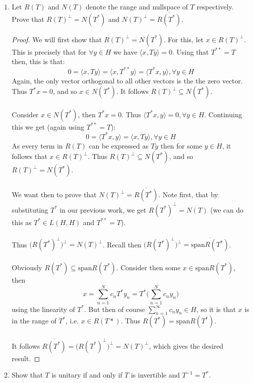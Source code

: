\documentclass[12pt]{article}
\newenvironment{ex}[2][Exercise]{\begin{trivlist}
\item[\hskip \labelsep {\bfseries #1}\hskip \labelsep {\bfseries #2.}]}{\end{trivlist}}
\begin{document}
\begin{ex}{8}
\begin{enumerate}[label=(\alph*)]
        \item Let $R(T)$ and $N(T)$ denote the range and nullspace of $T$ respectively. Prove that $R(T)^\perp = N(T^*)$ and $N(T)^\perp = \overline{R(T^*)}$.
        \begin{proof}
            We will first show that $R(T)^\perp = N(T^*)$. For this, let $x \in R(T)^\perp$. This is precisely that for $\forall y \in H$ we have $\langle x, Ty \rangle = 0$. Using that $T^{**} = T$ then, this is that:
            $$0 = \langle x, Ty \rangle = \langle x, T^{**}y \rangle = \langle T^*x, y \rangle, \forall y \in H$$
            Again, the only vector orthogonal to all other vectors is the the zero vector. Thus $T^*x = 0$, and so $x \in N(T^*)$. It follows $R(T)^\perp \subseteq N(T^*)$. \\ \\
            Consider $x \in N(T^*)$, then $T^*x = 0$. Thus $\langle T^*x, y \rangle = 0, \forall y \in H$. Continuing this we get (again using $T^{**} = T$):
            $$0 = \langle T^*x, y \rangle = \langle x, Ty \rangle, \forall y \in H$$
            As every term in $R(T)$ can be expressed as $Ty$ then for some $y \in H$, it follows that $x \in R(T)^\perp$. Thus $R(T)^\perp \subseteq N(T^*)$, and so $R(T)^\perp = N(T^*)$. \\ \\
            We want then to prove that $N(T)^\perp = \overline{R(T^*)}$. Note first, that by substituting $T^*$ in our previous work, we get $R(T^*)^\perp = N(T)$ (we can do this as $T^* \in L(H,H)$ and $T^{**} = T$). \\ \\
            Thus $\Big (R(T^*)^\perp \Big)^\perp = N(T)^\perp$. Recall then $\Big (R(T^*)^\perp \Big)^\perp = \overline{\text{span} R(T^*)}$. \\ \\
            Obviously $R(T^*) \subseteq \text{span} R(T^*)$. Consider then some $x \in \text{span} R(T^*)$, then $$x = \sum_{n = 1}^N c_nT^*y_n = T^* \Big ( \sum_{n = 1}^N c_ny_n \Big)$$ using the linearity of $T^*$. But then of course $\sum_{n = 1}^\infty c_ny_n \in H$, so it is that $x$ is in the range of $T^*$, i.e. $x \in R(T*)$. Thus $R(T^*) = \text{span} R(T^*)$. \\ \\
            It follows $\overline{R(T^*)} = \Big (R(T^*)^\perp \Big)^\perp = N(T)^\perp$, which gives the desired result.
        \end{proof}
        \item Show that $T$ is unitary if and only if $T$ is invertible and $T^{-1} = T^*$. 

\end{enumerate}
\end{ex}
\end{document}
